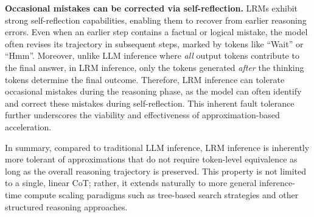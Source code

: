 \textbf{Occasional mistakes can be corrected via self-reflection.} LRMs exhibit strong self-reflection capabilities, enabling them to recover from earlier reasoning errors. 
Even when an earlier step contains a factual or logical mistake, the model often revises its trajectory in subsequent steps, marked by tokens like ``Wait'' or ``Hmm''. Moreover, unlike LLM inference where {\em all} output tokens contribute to the final answer, in LRM inference, only the tokens generated {\em after} the thinking tokens determine the final outcome. Therefore, LRM inference can tolerate occasional mistakes during the reasoning phase, as the model can often identify and correct these mistakes during self-reflection. This inherent fault tolerance further underscores the viability and effectiveness of approximation-based acceleration.

In summary, compared to traditional LLM inference, LRM inference is inherently more tolerant of approximations that do not require token-level equivalence as long as the overall reasoning trajectory is preserved. This property is not limited to a single, linear CoT; rather, it extends naturally to more general inference-time compute scaling paradigms such as tree-based search strategies and other structured reasoning approaches.











